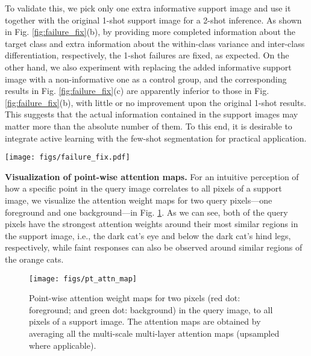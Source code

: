 \documentclass[runningheads,table,xcdraw]{llncs}
\begin{document}
To validate this, we pick only one extra informative support image and use it together with the original 1-shot support image for a 2-shot inference.
As shown in Fig. \ref{fig:failure_fix}(b), by providing more completed information about the target class and extra information about the within-class variance and inter-class differentiation, respectively, the 1-shot failures are fixed, as expected.
On the other hand, we also experiment with replacing the added informative support image with a non-informative one as a control group, and the corresponding results in Fig. \ref{fig:failure_fix}(c) are apparently inferior to those in Fig. \ref{fig:failure_fix}(b), with little or no improvement upon the original 1-shot results.
This suggests that the actual information contained in the support images may matter more than the absolute number of them.
To this end, it is desirable to integrate active learning with the few-shot segmentation for practical application.

\begin{figure*}[!t]
  \centering
  \texttt{[image: figs/failure\_fix.pdf]}
  \caption{Control experiment on fixing 1-shot failures by adding one extra support image:
  (a) the same cases as shown in Fig. \ref{fig:failure_5shotresults} (left);
(b) the failures are effectively fixed with an informative support image added; and
  (c) adding a non-informative support image helps little.}
  \label{fig:failure_fix}
\end{figure*}










\textbf{Visualization of point-wise attention maps.}
For an intuitive perception of how a specific point in the query image correlates to all pixels of a support image, we visualize the attention weight maps for two query pixels---one foreground and one background---in Fig. \ref{fig:attn}.
As we can see, both of the query pixels have the strongest attention weights around their most similar regions in the support image, i.e., the dark cat's eye and below the dark cat's hind legs, respectively, while faint responses can also be observed around similar regions of the orange cats.


\begin{figure}[t]
  \centering
  \texttt{[image: figs/pt\_attn\_map]}
  \caption{Point-wise attention weight maps for two pixels (red dot: foreground; and green dot: background) in the query image, to all pixels of a support image.
  The attention maps are obtained by averaging all the multi-scale multi-layer attention maps (upsampled where applicable).}\label{fig:attn}
\end{figure}
\end{document}
